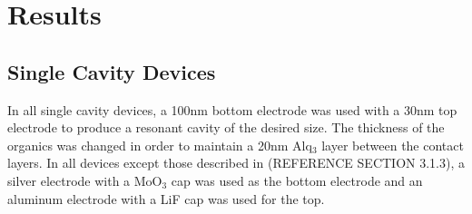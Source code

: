 \documentclass{report}
\begin{document}
\chapter{Results}

    \section{Single Cavity Devices}
    
        In all single cavity devices, a 100nm bottom electrode was used with a 30nm top electrode to produce a resonant cavity of the desired size. The thickness of the organics was changed in order to maintain a 20nm Alq$_3$ layer between the contact layers. In all devices except those described in (REFERENCE SECTION 3.1.3), a silver electrode with a MoO$_3$ cap was used as the bottom electrode and an aluminum electrode with a LiF cap was used for the top.
        
\end{document}
